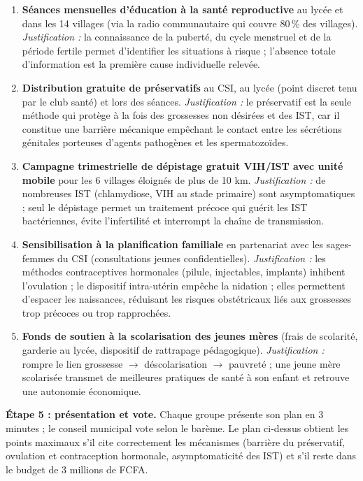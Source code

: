 \documentclass[11pt]{article}
\begin{document}
\begin{exoresolu}
\begin{enumerate}
\item \textbf{Séances mensuelles d'éducation à la santé reproductive} au lycée et dans les 14 villages (via la radio communautaire qui couvre 80\,\% des villages). \emph{Justification :} la connaissance de la puberté, du cycle menstruel et de la période fertile permet d'identifier les situations à risque ; l'absence totale d'information est la première cause individuelle relevée.
\item \textbf{Distribution gratuite de préservatifs} au CSI, au lycée (point discret tenu par le club santé) et lors des séances. \emph{Justification :} le préservatif est la seule méthode qui protège à la fois des grossesses non désirées et des IST, car il constitue une barrière mécanique empêchant le contact entre les sécrétions génitales porteuses d'agents pathogènes et les spermatozoïdes.
\item \textbf{Campagne trimestrielle de dépistage gratuit VIH/IST avec unité mobile} pour les 6 villages éloignés de plus de 10 km. \emph{Justification :} de nombreuses IST (chlamydiose, VIH au stade primaire) sont asymptomatiques ; seul le dépistage permet un traitement précoce qui guérit les IST bactériennes, évite l'infertilité et interrompt la chaîne de transmission.
\item \textbf{Sensibilisation à la planification familiale} en partenariat avec les sages-femmes du CSI (consultations jeunes confidentielles). \emph{Justification :} les méthodes contraceptives hormonales (pilule, injectables, implants) inhibent l'ovulation ; le dispositif intra-utérin empêche la nidation ; elles permettent d'espacer les naissances, réduisant les risques obstétricaux liés aux grossesses trop précoces ou trop rapprochées.
\item \textbf{Fonds de soutien à la scolarisation des jeunes mères} (frais de scolarité, garderie au lycée, dispositif de rattrapage pédagogique). \emph{Justification :} rompre le lien grossesse $\rightarrow$ déscolarisation $\rightarrow$ pauvreté ; une jeune mère scolarisée transmet de meilleures pratiques de santé à son enfant et retrouve une autonomie économique.
\end{enumerate}

\textbf{Étape 5 : présentation et vote.} Chaque groupe présente son plan en 3 minutes ; le conseil municipal vote selon le barème. Le plan ci-dessus obtient les points maximaux s'il cite correctement les mécanismes (barrière du préservatif, ovulation et contraception hormonale, asymptomaticité des IST) et s'il reste dans le budget de 3 millions de FCFA.
\end{exoresolu}
\end{document}

